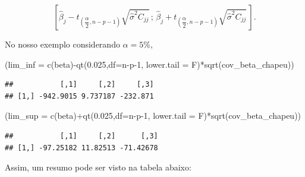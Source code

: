 \documentclass[
]{book}
\newenvironment{Shaded}{\begin{snugshade}}{\end{snugshade}}
\newcommand{\AttributeTok}[1]{\textcolor[rgb]{0.77,0.63,0.00}{#1}}
\newcommand{\DecValTok}[1]{\textcolor[rgb]{0.00,0.00,0.81}{#1}}
\newcommand{\FloatTok}[1]{\textcolor[rgb]{0.00,0.00,0.81}{#1}}
\newcommand{\FunctionTok}[1]{\textcolor[rgb]{0.00,0.00,0.00}{#1}}
\newcommand{\NormalTok}[1]{#1}
\newcommand{\SpecialCharTok}[1]{\textcolor[rgb]{0.00,0.00,0.00}{#1}}
\begin{document}
\[\left[\widehat{\beta}_j-t_{\left(\dfrac{\alpha}{2},n-p-1\right)}{\sqrt{\widehat{\sigma}^2 C_{jj}}}\,;\,\widehat{\beta}_j+t_{\left(\dfrac{\alpha}{2},n-p-1\right)}{\sqrt{\widehat{\sigma}^2 C_{jj}}}\, \right].\]

No nosso exemplo considerando \(\alpha=5\%\),

\begin{Shaded}
\begin{Highlighting}[]
\NormalTok{(}\AttributeTok{lim\_inf =} \FunctionTok{c}\NormalTok{(beta)}\SpecialCharTok{{-}}\FunctionTok{qt}\NormalTok{(}\FloatTok{0.025}\NormalTok{,}\AttributeTok{df=}\NormalTok{n}\SpecialCharTok{{-}}\NormalTok{p}\DecValTok{{-}1}\NormalTok{, }\AttributeTok{lower.tail =}\NormalTok{ F)}\SpecialCharTok{*}\FunctionTok{sqrt}\NormalTok{(cov\_beta\_chapeu))}
\end{Highlighting}
\end{Shaded}

\begin{verbatim}
##           [,1]     [,2]     [,3]
## [1,] -942.9015 9.737187 -232.871
\end{verbatim}

\begin{Shaded}
\begin{Highlighting}[]
\NormalTok{(}\AttributeTok{lim\_sup =} \FunctionTok{c}\NormalTok{(beta)}\SpecialCharTok{+}\FunctionTok{qt}\NormalTok{(}\FloatTok{0.025}\NormalTok{,}\AttributeTok{df=}\NormalTok{n}\SpecialCharTok{{-}}\NormalTok{p}\DecValTok{{-}1}\NormalTok{, }\AttributeTok{lower.tail =}\NormalTok{ F)}\SpecialCharTok{*}\FunctionTok{sqrt}\NormalTok{(cov\_beta\_chapeu))}
\end{Highlighting}
\end{Shaded}

\begin{verbatim}
##           [,1]     [,2]      [,3]
## [1,] -97.25182 11.82513 -71.42678
\end{verbatim}

Assim, um resumo pode ser visto na tabela abaixo:
\end{document}
